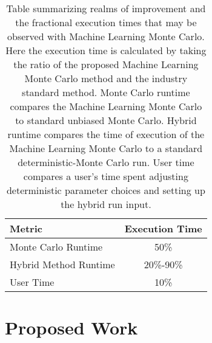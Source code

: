 \documentclass[letterpaper,12pt]{article}
\begin{document}
\begin{table}
  \centering
    \begin{tabular}{ | l | c | }
     \hline
     Metric & Execution Time \\ \hline
     Monte Carlo Runtime & 50\%  \\
     Hybrid Method Runtime & 20\%-90\% \\
     User Time & 10\% \\
     \hline
    \end{tabular}
    \caption{Table summarizing realms of improvement and the fractional
      execution times that may be observed with Machine Learning Monte Carlo.
      Here the execution time is calculated by taking
    the ratio of the proposed Machine Learning Monte Carlo method and the
    industry standard method. Monte Carlo runtime compares the Machine
  Learning Monte Carlo to standard unbiased Monte Carlo. Hybrid runtime
  compares the time of execution of the Machine Learning Monte Carlo to a
  standard deterministic-Monte Carlo run. User time compares a user's time spent
adjusting deterministic parameter choices and setting up the hybrid run input.}
   \label{tab:improve}
\end{table}


\section{Proposed Work}
\end{document}
